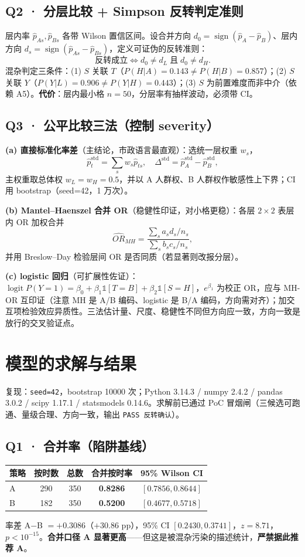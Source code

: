 \documentclass[12pt,a4paper]{ctexart}
\begin{document}
\subsection{Q2 · 分层比较 + Simpson 反转判定准则}
层内率 $\hat p_{As},\hat p_{Bs}$ 各带 Wilson 置信区间。设合并方向 $d_0=\operatorname{sign}(\hat p_A-\hat p_B)$、层内方向 $d_s=\operatorname{sign}(\hat p_{As}-\hat p_{Bs})$，定义可证伪的反转准则：
\[ \textbf{反转成立} \iff d_0\neq d_L \;\text{且}\; d_0\neq d_H. \]
混杂判定三条件：(1) $S$ 关联 $T$（$P(H|A)=0.143\neq P(H|B)=0.857$）；(2) $S$ 关联 $Y$（$P(Y|L)=0.906\neq P(Y|H)=0.443$）；(3) $S$ 为前置难度而非中介（依赖 A5）。\textbf{代价}：层内最小格 $n=50$，分层率有抽样波动，必须带 CI。

\subsection{Q3 · 公平比较三法（控制 severity）}
\textbf{(a) 直接标准化率差}（主结论，市政语言最直观）：选统一层权重 $w_s$，
\[ \hat p_t^{\text{std}}=\sum_{s}w_s\hat p_{ts},\quad \Delta^{\text{std}}=\hat p_A^{\text{std}}-\hat p_B^{\text{std}}, \]
主权重取总体权 $w_L=w_H=0.5$，并以 A 人群权、B 人群权作敏感性上下界；CI 用 bootstrap（seed=42，1 万次）。

\textbf{(b) Mantel--Haenszel 合并 OR}（稳健性印证，对小格更稳）：各层 $2\times2$ 表层内 OR 加权合并
\[ \widehat{OR}_{MH}=\frac{\sum_s a_s d_s/n_s}{\sum_s b_s c_s/n_s}, \]
并用 Breslow--Day 检验层间 OR 是否同质（若显著则改报分层）。

\textbf{(c) logistic 回归}（可扩展性佐证）：$\operatorname{logit}P(Y=1)=\beta_0+\beta_1\mathbb{1}[T=B]+\beta_2\mathbb{1}[S=H]$，$e^{\beta_1}$ 为校正 OR，应与 MH-OR 互印证（注意 MH 是 A/B 编码、logistic 是 B/A 编码，方向需对齐）；加交互项检验效应异质性。三法估计量、尺度、稳健性不同但方向应一致，方向一致是放行的交叉验证点。

\section{模型的求解与结果}
复现：\texttt{seed=42}，bootstrap 10000 次；Python 3.14.3 / numpy 2.4.2 / pandas 3.0.2 / scipy 1.17.1 / statsmodels 0.14.6。求解前已通过 PoC 冒烟闸（三候选可跑通、量级合理、方向一致，输出 \texttt{PASS 反转确认}）。

\subsection{Q1 · 合并率（陷阱基线）}
\begin{center}
\begin{tabular}{lcccc}
\toprule
策略 & 按时数 & 总数 & 合并按时率 & 95\% Wilson CI \\
\midrule
A & 290 & 350 & \textbf{0.8286} & $[0.7856,0.8644]$ \\
B & 182 & 350 & \textbf{0.5200} & $[0.4677,0.5718]$ \\
\bottomrule
\end{tabular}
\end{center}
率差 A$-$B $=+0.3086$（$+30.86$ pp），95\% CI $[0.2430,0.3741]$，$z=8.71$，$p<10^{-15}$。\textbf{合并口径 A 显著更高}——但这是被混杂污染的描述统计，\textbf{严禁据此推荐 A}。
\end{document}
